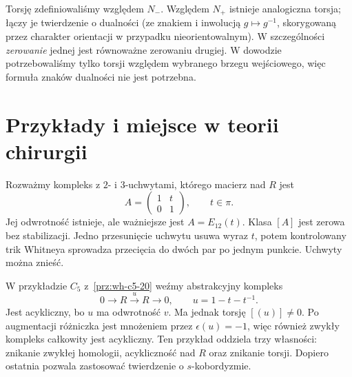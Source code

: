 \begin{uwaga}
Torsję zdefiniowaliśmy względem $N_-$.
Względem $N_+$ istnieje analogiczna torsja;
łączy je twierdzenie o dualności (ze znakiem
i inwolucją $g\mapsto g^{-1}$, skorygowaną
przez charakter orientacji w przypadku
nieorientowalnym). W szczególności
\emph{zerowanie} jednej jest równoważne
zerowaniu drugiej. W dowodzie potrzebowaliśmy
tylko torsji względem wybranego brzegu wejściowego,
więc formuła znaków dualności nie jest potrzebna.
\end{uwaga}

\section{Przykłady i miejsce w teorii chirurgii}
\label{sec:przyklady-s-kobordyzm-20}

\begin{przyklad}
Rozważmy kompleks z $2$- i $3$-uchwytami,
którego macierz nad $R$ jest
\[
 A=\begin{pmatrix}1&t\\0&1\end{pmatrix},\qquad t\in\pi.
\]
Jej odwrotność istnieje, ale ważniejsze jest
$A=E_{12}(t)$. Klasa $[A]$ jest zerowa bez
stabilizacji. Jedno przesunięcie uchwytu
usuwa wyraz $t$, potem kontrolowany trik
Whitneya sprowadza przecięcia do dwóch
par po jednym punkcie. Uchwyty można znieść.
\end{przyklad}

\begin{przyklad}
W przykładzie $C_5$ z~\ref{prz:wh-c5-20}
weźmy abstrakcyjny kompleks
\[
 0\longrightarrow R\xrightarrow{\ u\ }R
   \longrightarrow0,\qquad u=1-t-t^{-1}.
\]
Jest acykliczny, bo $u$ ma odwrotność $v$.
Ma jednak torsję $[(u)]\ne0$.
Po augmentacji różniczka jest mnożeniem
przez $\epsilon(u)=-1$, więc również zwykły
kompleks całkowity jest acykliczny. Ten przykład
oddziela trzy własności: znikanie zwykłej
homologii, acykliczność nad $R$ oraz znikanie
torsji. Dopiero ostatnia pozwala zastosować
twierdzenie o $s$-kobordyzmie.
\end{przyklad}

